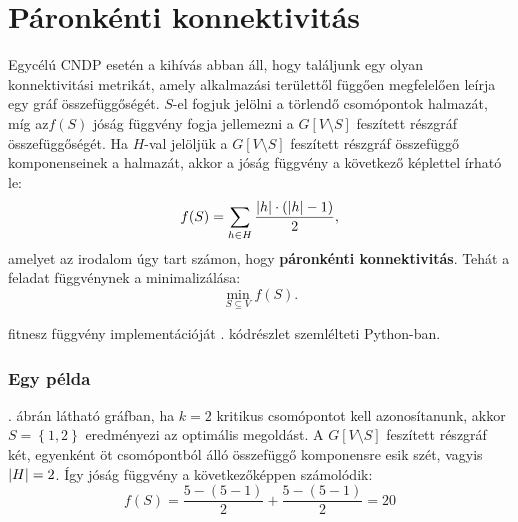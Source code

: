 \section{Páronkénti konnektivitás}\label{sec:PAIRWISE_CONNECTIVITY}
Egycélú CNDP esetén a kihívás abban áll, hogy találjunk egy olyan konnektivitási metrikát,
amely alkalmazási területtől függően megfelelően leírja egy gráf összefüggőségét.
$S$-el fogjuk jelölni a törlendő csomópontok halmazát,
míg az$f(S)$ jóság függvény fogja jellemezni a $G[V \setminus S]$ feszített részgráf összefüggőségét.
Ha $H$-val jelöljük a $G[V \setminus S]$ feszített részgráf összefüggő komponenseinek a halmazát,
akkor a jóság függvény a következő képlettel írható le:
\begin{equation}\label{eqn:PAIRWISE_CONNECTIVITY}
  f(S) = \sum_{h \in H} \frac{\lvert h\rvert \cdot (\lvert h\rvert - 1)}{2},
\end{equation}
amelyet az irodalom \cite{ventresca2012global, aringhieri2016general} úgy tart számon,
hogy \textbf{páronkénti konnektivitás}.
Tehát a feladat  függvénynek a minimalizálása:
\begin{equation}\label{eqn:MIN_PAIRWISE_CONNECTIVITY}
  \min_{S \subseteq V} f(S).
\end{equation}

 fitnesz függvény implementációját . kódrészlet szemlélteti Python-ban.



\subsubsection{Egy példa}
. ábrán látható gráfban,
ha $k = 2$ kritikus csomópontot kell azonosítanunk,
akkor $S = \left\{ 1, 2 \right\}$ eredményezi az optimális megoldást.
A $G\left[ V \setminus S \right]$ feszített részgráf két, egyenként öt csomópontból álló összefüggő komponensre esik szét,
vagyis $\lvert H\rvert = 2$. Így  jóság függvény a következőképpen számolódik:
\[
  f(S) = \dfrac{5 - (5 - 1)}{2} + \dfrac{5 - (5 - 1)}{2} = 20
\]

